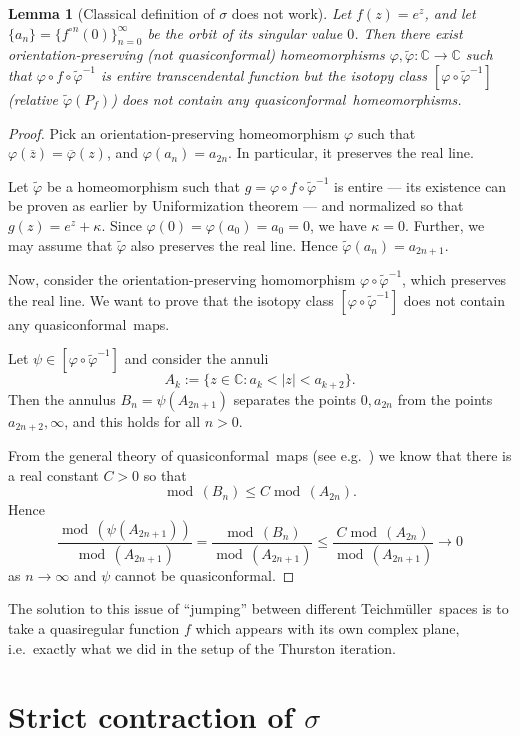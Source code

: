 \documentclass[10pt,reqno,a4paper]{amsart}
\numberwithin{figure}{section}
\numberwithin{equation}{section}
\newtheorem{lmm}[thm]{Lemma}
\newcommand{\tei}{Teichm\"uller}
\newcommand{\qc}{quasiconformal}
\renewcommand{\mod}{\operatorname{mod\,}}
\newcommand{\abs}[1]{\lvert #1 \rvert}
\begin{document}
\begin{lmm}[Classical definition of $\sigma$ does not work]
	Let $f(z)=e^z$, and let $\{a_n\}=\{f^{\circ n}(0)\}_{n=0}^\infty$ be the orbit of its singular value $0$. Then there exist orientation-preserving (not \qc) homeomorphisms $\varphi,\tilde{\varphi}:\mathbb{C}\to\mathbb{C}$ such that $\varphi\circ f\circ\tilde{\varphi}^{-1}$ is entire transcendental function but the isotopy class $[\varphi\circ\tilde{\varphi}^{-1}]$ (relative $\tilde{\varphi}(P_f)$) does not contain any \qc\ homeomorphisms.
\end{lmm} 
\begin{proof}
	Pick an orientation-preserving homeomorphism $\varphi$ such that $\varphi(\overline{z})=\overline{\varphi}(z)$, and $\varphi(a_n)=a_{2n}$. In particular, it preserves the real line.
	
	Let $\tilde{\varphi}$ be a homeomorphism such that $g=\varphi\circ f\circ\tilde{\varphi}^{-1}$ is entire --- its existence can be proven as earlier by Uniformization theorem --- and normalized so that $g(z)=e^z+\kappa$. Since $\varphi(0)=\varphi(a_0)=a_0=0$, we have $\kappa=0$. Further, we may assume that $\tilde{\varphi}$ also preserves the real line. Hence $\tilde{\varphi}(a_n)=a_{2n+1}$.
	
	Now, consider the orientation-preserving homomorphism $\varphi\circ\tilde{\varphi}^{-1}$, which preserves the real line. We want to prove that the isotopy class $[\varphi\circ\tilde{\varphi}^{-1}]$ does not contain any \qc\ maps.
	
	Let $\psi\in[\varphi\circ\tilde{\varphi}^{-1}]$ and consider the annuli
	$$A_k:=\{z\in\mathbb{C}: a_{k}<\abs{z}<a_{k+2} \}.$$
	Then the annulus $B_n=\psi(A_{2n+1})$ separates the points $0,a_{2n}$ from the points $a_{2n+2},\infty$, and this holds for all $n>0$.
	
	From the general theory of \qc\ maps (see e.g.\ \cite{LehtoVirtanen}) we know that there is a real constant $C>0$ so that
	$$\mod(B_n)\leq C\mod(A_{2n}).$$
	Hence $$\frac{\mod(\psi(A_{2n+1}))}{\mod(A_{2n+1})}=\frac{\mod(B_n)}{\mod(A_{2n+1})}\leq\frac{C \mod(A_{2n})}{\mod(A_{2n+1})}\to 0$$
	as $n\to\infty$ and $\psi$ cannot be \qc.
\end{proof}

The solution to this issue of ``jumping'' between different \tei\ spaces is to take a quasiregular function $f$ which appears with its own complex plane, i.e.\ exactly what we did in the setup of the Thurston iteration.

\section{Strict contraction of $\sigma$}
\label{sec:strict_contraction}
\end{document}
